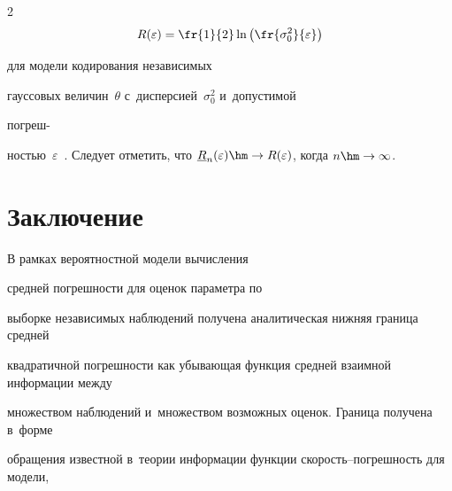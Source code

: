\begin{multicols}{2}
$$


R(\varepsilon) = \fr{1}{2}\ln\left(\fr{\sigma_0^2}{\varepsilon}\right)


$$ 


для модели кодирования независимых 


гауссовых величин~$\theta$ с~дисперсией~$\sigma_0^2$ и~до\-пус\-ти\-мой 


по\-греш-\linebreak\vspace*{-12pt}





\columnbreak





\noindent


ностью~$\varepsilon$~\cite{9-lan}. Следует отметить, что $\underline{R}_n(\varepsilon) 


\hm\to R(\varepsilon)$, когда $n\hm\to \infty$.








\vspace*{-11pt}








\section{Заключение}





\vspace*{-4pt}





В рамках вероятностной модели вы\-чис\-ле\-ния\linebreak


 сред\-ней по\-греш\-ности для оценок па\-ра\-мет\-ра по 


выборке независимых наблюдений получена аналитическая ниж\-няя граница сред\-ней 


квад\-ра\-тич\-ной по\-греш\-ности как убы\-ва\-ющая функция средней \mbox{взаимной} информации между 


множеством наблюдений и~множеством возможных оценок. Граница получена в~форме 


обращения известной в~тео\-рии информации функции ско\-рость--по\-греш\-ность для модели, 



\end{multicols}

